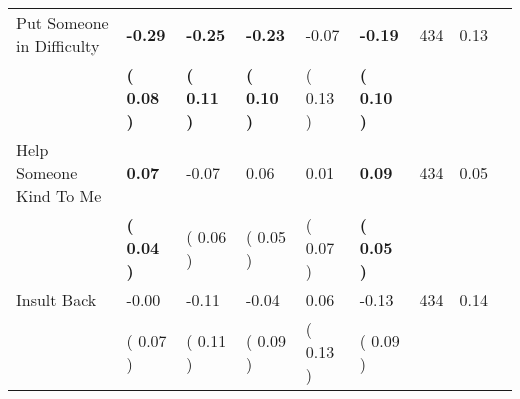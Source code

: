 \begin{tabular}{L{6.2cm} C{1.8cm} C{1.8cm} C{1.8cm} C{1.8cm} C{1.8cm} C{1.8cm} C{0.3cm} C{0.3cm}}
Put Someone in Difficulty & \textbf{    -0.29} & \textbf{    -0.25} & \textbf{    -0.23} &     -0.07 & \textbf{    -0.19}  & 434 &       0.13 \\ 
 & \textbf{(     0.08 )} & \textbf{(     0.11 )} & \textbf{(     0.10 )} & (     0.13 ) & \textbf{(     0.10 )}  & \\
Help Someone Kind To Me & \textbf{     0.07} &     -0.07 &      0.06 &      0.01 & \textbf{     0.09}  & 434 &       0.05 \\ 
 & \textbf{(     0.04 )} & (     0.06 ) & (     0.05 ) & (     0.07 ) & \textbf{(     0.05 )}  & \\
Insult Back &     -0.00 &     -0.11 &     -0.04 &      0.06 &     -0.13  & 434 &       0.14 \\ 
 & (     0.07 ) & (     0.11 ) & (     0.09 ) & (     0.13 ) & (     0.09 )  & \\
\bottomrule
\end{tabular}
